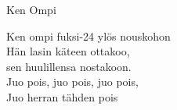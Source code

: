 \begin{song}{Ken Ompi}

\repetitionbegin{} Ken ompi fuksi-24 ylös nouskohon \repetitionend{}\\
Hän lasin käteen ottakoo,\\
sen huulillensa nostakoon.\\
\repetitionbegin{} Juo pois, juo pois, juo pois,\\
Juo herran tähden pois \repetitionend{}

\end{song}